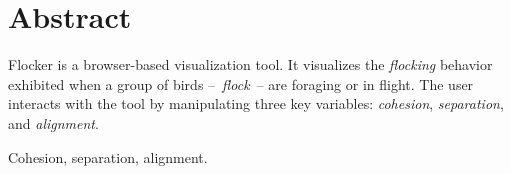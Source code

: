 \documentclass[../main]{subfiles}
\begin{document}
\section{Abstract}
\label{abstract}

Flocker is a browser-based visualization tool. It visualizes the {\em flocking} behavior exhibited when
a group of birds --~{\em flock}~-- are foraging or in flight. The user interacts with the tool by
manipulating three key variables: {\em cohesion}, {\em separation}, and {\em alignment}.

\begin{IEEEkeywords}
    Cohesion, separation, alignment.
\end{IEEEkeywords}
\end{document}
